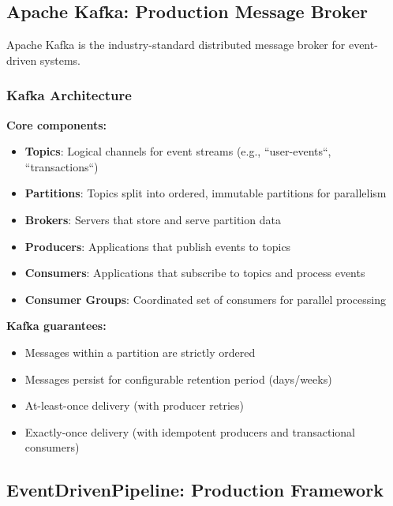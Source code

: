 \subsection{Apache Kafka: Production Message Broker}

Apache Kafka is the industry-standard distributed message broker for event-driven systems.

\subsubsection{Kafka Architecture}

\textbf{Core components:}
\begin{itemize}
    \item \textbf{Topics}: Logical channels for event streams (e.g., ``user-events``, ``transactions``)
    \item \textbf{Partitions}: Topics split into ordered, immutable partitions for parallelism
    \item \textbf{Brokers}: Servers that store and serve partition data
    \item \textbf{Producers}: Applications that publish events to topics
    \item \textbf{Consumers}: Applications that subscribe to topics and process events
    \item \textbf{Consumer Groups}: Coordinated set of consumers for parallel processing
\end{itemize}

\textbf{Kafka guarantees:}
\begin{itemize}
    \item Messages within a partition are strictly ordered
    \item Messages persist for configurable retention period (days/weeks)
    \item At-least-once delivery (with producer retries)
    \item Exactly-once delivery (with idempotent producers and transactional consumers)
\end{itemize}

\subsection{EventDrivenPipeline: Production Framework}

